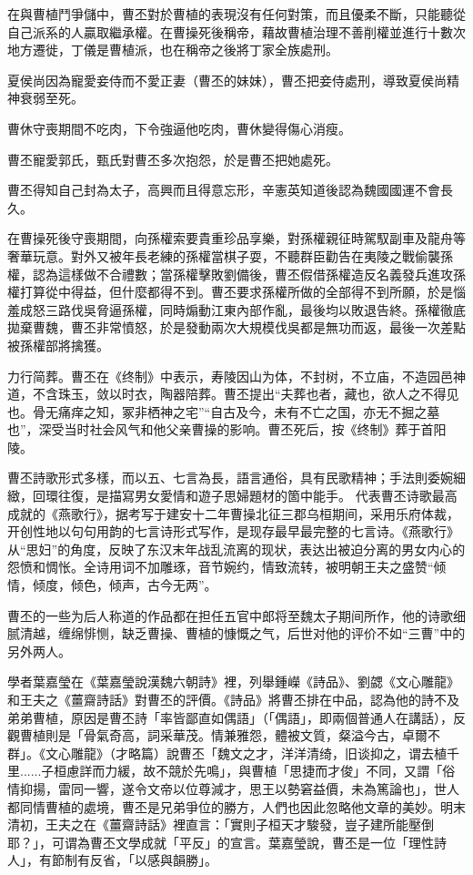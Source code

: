 在與曹植鬥爭儲中，曹丕對於曹植的表現沒有任何對策，而且優柔不斷，只能聽從自己派系的人贏取繼承權。在曹操死後稱帝，藉故曹植治理不善削權並進行十數次地方遷徙，丁儀是曹植派，也在稱帝之後將丁家全族處刑。

夏侯尚因為寵愛妾侍而不愛正妻（曹丕的妹妹），曹丕把妾侍處刑，導致夏侯尚精神衰弱至死。

曹休守喪期間不吃肉，下令強逼他吃肉，曹休變得傷心消瘦。

曹丕寵愛郭氏，甄氏對曹丕多次抱怨，於是曹丕把她處死。

曹丕得知自己封為太子，高興而且得意忘形，辛憲英知道後認為魏國國運不會長久。

在曹操死後守喪期間，向孫權索要貴重珍品享樂，對孫權親征時駕馭副車及龍舟等奢華玩意。對外又被年長老練的孫權當棋子耍，不聽群臣勸告在夷陵之戰偷襲孫權，認為這樣做不合禮數；當孫權擊敗劉備後，曹丕假借孫權造反名義發兵進攻孫權打算從中得益，但什麼都得不到。曹丕要求孫權所做的全部得不到所願，於是惱羞成怒三路伐吳脅逼孫權，同時煽動江東內部作亂，最後均以敗退告終。孫權徹底拋棄曹魏，曹丕非常憤怒，於是發動兩次大規模伐吳都是無功而返，最後一次差點被孫權部將擒獲。

力行简葬。曹丕在《终制》中表示，寿陵因山为体，不封树，不立庙，不造园邑神道，不含珠玉，敛以时衣，陶器陪葬。曹丕提出“夫葬也者，藏也，欲人之不得见也。骨无痛痒之知，冢非栖神之宅”“自古及今，未有不亡之国，亦无不掘之墓也”，深受当时社会风气和他父亲曹操的影响。曹丕死后，按《终制》葬于首阳陵。

曹丕詩歌形式多樣，而以五、七言為長，語言通俗，具有民歌精神；手法則委婉細緻，回環往復，是描寫男女愛情和遊子思婦題材的箇中能手。 代表曹丕诗歌最高成就的《燕歌行》，据考写于建安十二年曹操北征三郡乌桓期间，采用乐府体裁，开创性地以句句用韵的七言诗形式写作，是现存最早最完整的七言诗。《燕歌行》从“思妇”的角度，反映了东汉末年战乱流离的现状，表达出被迫分离的男女内心的怨愤和惆怅。全诗用词不加雕琢，音节婉约，情致流转，被明朝王夫之盛赞“倾情，倾度，倾色，倾声，古今无两”。

曹丕的一些为后人称道的作品都在担任五官中郎将至魏太子期间所作，他的诗歌细腻清越，缠绵悱恻，缺乏曹操、曹植的慷慨之气，后世对他的评价不如“三曹”中的另外两人。

學者葉嘉瑩在《葉嘉瑩說漢魏六朝詩》裡，列舉鍾嶸《詩品》、劉勰《文心雕龍》和王夫之《薑齋詩話》對曹丕的評價。《詩品》將曹丕排在中品，認為他的詩不及弟弟曹植，原因是曹丕詩「率皆鄙直如偶語」（「偶語」，即兩個普通人在講話），反觀曹植則是「骨氣奇高，詞采華茂。情兼雅怨，體被文質，粲溢今古，卓爾不群」。《文心雕龍》（才略篇）說曹丕「魏文之才，洋洋清绮，旧谈抑之，谓去植千里......子桓慮詳而力緩，故不競於先鳴」，與曹植「思捷而才俊」不同，又謂「俗情抑揚，雷同一響，遂令文帝以位尊減才，思王以勢窘益價，未為篤論也」，世人都同情曹植的處境，曹丕是兄弟爭位的勝方，人們也因此忽略他文章的美妙。明末清初，王夫之在《薑齋詩話》裡直言：「實則子桓天才駿發，豈子建所能壓倒耶？」，可谓為曹丕文學成就「平反」的宣言。葉嘉瑩說，曹丕是一位「理性詩人」，有節制有反省，「以感與韻勝」。

